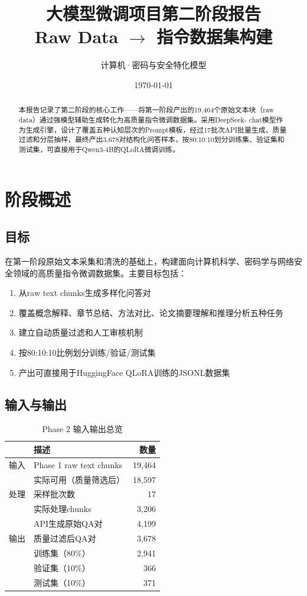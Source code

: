 \documentclass[12pt,a4paper]{ctexart}
\title{\textbf{大模型微调项目第二阶段报告}\\[4pt]\large Raw Data $\to$ 指令数据集构建}
\author{计算机·密码与安全特化模型}
\date{\today}
\begin{document}
\maketitle\thispagestyle{empty}

\begin{abstract}
\noindent 本报告记录了第二阶段的核心工作——将第一阶段产出的19,464个原始文本块（raw data）通过强模型辅助生成转化为高质量指令微调数据集。采用DeepSeek- chat模型作为生成引擎，设计了覆盖五种认知层次的Prompt模板，经过17批次API批量生成、质量过滤和分层抽样，最终产出3,678对结构化问答样本，按80:10:10划分训练集、验证集和测试集，可直接用于Qwen3-4B的QLoRA微调训练。
\end{abstract}

\section{阶段概述}

\subsection{目标}

在第一阶段原始文本采集和清洗的基础上，构建面向计算机科学、密码学与网络安全领域的高质量指令微调数据集。主要目标包括：

\begin{enumerate}[nosep]
    \item 从raw text chunks生成多样化问答对
    \item 覆盖概念解释、章节总结、方法对比、论文摘要理解和推理分析五种任务
    \item 建立自动质量过滤和人工审核机制
    \item 按80:10:10比例划分训练/验证/测试集
    \item 产出可直接用于HuggingFace QLoRA训练的JSONL数据集
\end{enumerate}

\subsection{输入与输出}

\begin{table}[htbp]\centering
\caption{Phase 2 输入输出总览}
\begin{tabular}{@{}llr@{}}
\toprule & \textbf{描述} & \textbf{数量} \\
\midrule
输入 & Phase 1 raw text chunks & 19,464 \\
     & 实际可用（质量筛选后） & 18,597 \\
\midrule
处理 & 采样批次数 & 17 \\
     & 实际处理chunks & 3,206 \\
     & API生成原始QA对 & 4,199 \\
\midrule
输出 & 质量过滤后QA对 & 3,678 \\
     & 训练集（80\%） & 2,941 \\
     & 验证集（10\%） & 366 \\
     & 测试集（10\%） & 371 \\
\bottomrule
\end{tabular}
\end{table}
\end{document}
